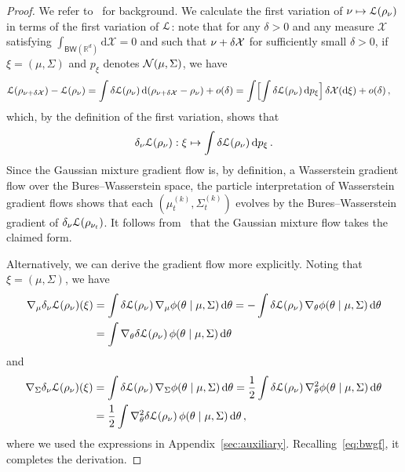 \documentclass{custom}
\begin{document}
\begin{proof}
We refer to~\citet[Appendix F]{Lam+22GVI} for background.
We calculate the first variation of $\nu \mapsto \EuScript{L}(\rho_\nu)$ in terms of the first variation of $\EuScript{L}$: note that for any $\delta>0$
and any measure $\mathcal{X}$ satisfying $\int_{\mathsf{BW}(\mathbb{R}^{d})}\mathrm{d}\mathcal{X}=0$ and such that $\nu+\delta\mathcal X$ for sufficiently small $\delta > 0$, if $\xi = (\mu,\Sigma)$ and $p_\xi$ denotes $\mathcal N(\mu,\Sigma)$,
we have
\begin{align*}
    \EuScript{L}(\rho_{\nu+\delta\mathcal X}) - \EuScript{L}(\rho_\nu)
    &= \int \delta\EuScript{L}(\rho_\nu)\,\mathrm d (\rho_{\nu+\delta\mathcal X}-\rho_\nu) + o(\delta)
    = \int \Bigl[\int \delta \EuScript{L}(\rho_\nu)\, \mathrm d p_\xi\Bigr] \,\delta \mathcal X(\mathrm d \xi) + o(\delta)\,,
\end{align*}
which, by the definition of the first variation, shows that
\[
\delta_\nu\EuScript{L}(\rho_\nu):\xi\mapsto \int \delta\EuScript{L}(\rho_\nu)\,\mathrm d p_\xi\,.
\]
Since the Gaussian mixture gradient flow is, by definition, a Wasserstein gradient flow over the Bures--Wasserstein space, the particle interpretation of Wasserstein gradient flows shows that each $(\mu_t^{(k)},\Sigma_t^{(k)})$ evolves by the Bures--Wasserstein gradient of $\delta_\nu \EuScript{L}(\rho_{\nu_t})$.
It follows from~\citet[Appendix C]{Lam+22GVI} that the Gaussian mixture flow takes the claimed form.

Alternatively, we can derive the gradient flow more explicitly.
Noting that $\xi=(\mu,\Sigma)$, we have
\begin{align*}
\nabla_{\mu}\delta_\nu\EuScript{L}(\rho_\nu)(\xi)
&= \int \delta \EuScript{L}(\rho_\nu) \, \nabla_\mu \phi(\theta \mid \mu,\Sigma) \, \mathrm d \theta
= -\int \delta \EuScript{L}(\rho_\nu) \, \nabla_\theta \phi(\theta \mid \mu,\Sigma) \, \mathrm d \theta \\
&= \int \nabla_\theta \delta \EuScript{L}(\rho_\nu) \, \phi(\theta \mid \mu,\Sigma)\,\mathrm d \theta
\end{align*}
and
\begin{align*}
\nabla_{\Sigma}\delta_\nu\EuScript{L}(\rho_\nu)(\xi)
&= \int \delta \EuScript{L}(\rho_\nu) \, \nabla_\Sigma \phi(\theta \mid \mu,\Sigma) \, \mathrm d \theta
= \frac{1}{2}\int \delta \EuScript{L}(\rho_\nu) \, \nabla^2_\theta \phi(\theta \mid \mu,\Sigma) \, \mathrm d \theta \\
&= \frac{1}{2} \int \nabla_\theta^2 \delta \EuScript{L}(\rho_\nu) \, \phi(\theta \mid \mu,\Sigma)\,\mathrm d \theta\,,
\end{align*}
where we used the expressions in Appendix~\ref{sec:auxiliary}.
Recalling~\eqref{eq:bwgf}, it completes the derivation.
\end{proof}
\end{document}
